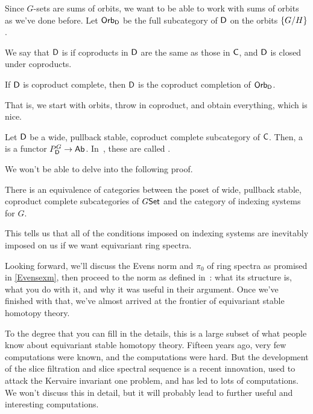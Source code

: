 Since $G$-sets are sums of orbits, we want to be able to work with sums of orbits as we've done before. Let
$\mathsf{Orb}_\mathsf D$ be the full subcategory of $\mathsf D$ on the orbits $\{G/H\}$.
\begin{defn}
We say that $\mathsf D$ is  if coproducts in $\mathsf D$ are the same as those in $\mathsf C$, and $\mathsf D$ is
closed under coproducts.
\end{defn}
\begin{lem}
If $\mathsf D$ is coproduct complete, then $\mathsf D$ is the coproduct completion of $\mathsf{Orb}_\mathsf D$.
\end{lem}
That is, we start with orbits, throw in coproduct, and obtain everything, which is nice.
\begin{defn}
Let $\mathsf D$ be a wide, pullback stable, coproduct complete subcategory of $\mathsf C$. Then, a 
is a functor $P_\mathsf D^G\to\mathsf{Ab}$. In~\cite{BlumbergHill}, these are called .
\end{defn}
We won't be able to delve into the following proof.
\begin{thm}
There is an equivalence of categories between the poset of wide, pullback stable, coproduct complete subcategories
of $G\mathsf{Set}$ and the category of indexing systems for $G$.
\end{thm}
This tells us that all of the conditions imposed on indexing systems are inevitably imposed on us if we want
equivariant ring spectra.

Looking forward, we'll discuss the Evens norm and $\pi_0$ of ring spectra as promised in \cref{Evensexm}, then
proceed to the norm as defined in~\cite{HHR}: what its structure is, what you do with it, and why it was useful in
their argument. Once we've finished with that, we've almost arrived at the frontier of equivariant stable homotopy
theory.

To the degree that you can fill in the details, this is a large subset of what people know about equivariant stable
homotopy theory. Fifteen years ago, very few computations were known, and the computations were hard. But the
development of the slice filtration and slice spectral sequence is a recent innovation, used to attack the Kervaire
invariant one problem, and has led to lots of computations. We won't discuss this in detail, but it will probably
lead to further useful and interesting computations.
